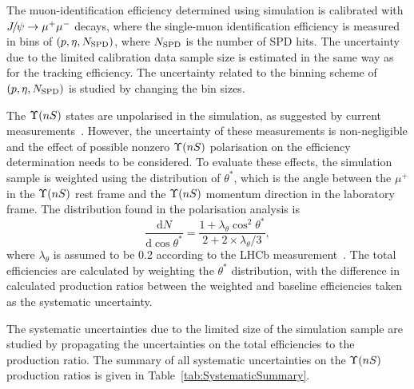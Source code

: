 \documentclass[12pt,a4paper]{article}
\def\Pmu         {\ensuremath{\upmu}\xspace}
\def\Ppsi        {\ensuremath{\uppsi}\xspace}
\def\PJ      {\ensuremath{\mathrm{J}}\xspace}
\def\Pmu         {\ensuremath{\mu}\xspace}
\def\Ppsi        {\ensuremath{\psi}\xspace}
\def\PJ      {\ensuremath{J}\xspace}
\def\mup        {{\ensuremath{\Pmu^+}}\xspace}
\def\mumu       {{\ensuremath{\Pmu^+\Pmu^-}}\xspace}
\def\jpsi     {{\ensuremath{{\PJ\mskip -3mu/\mskip -2mu\Ppsi}}}\xspace}
\def\to                 {\ensuremath{\rightarrow}\xspace}
\def\deriv {\ensuremath{\mathrm{d}}}
\begin{document}
The muon-identification efficiency determined using simulation is calibrated with $\jpsi\to\mumu$ decays, where the single-muon identification efficiency is measured in bins of $(p,\eta, N_{\rm{SPD}})$, where $N_{\rm{SPD}}$ is the number of SPD hits.
The uncertainty due to the limited calibration data sample size is estimated in the same way as for the tracking efficiency. 
The uncertainty related to the binning scheme of $(p,\eta, N_{\rm{SPD}})$ is studied by changing the bin sizes.

The $\Upsilon{(nS)}$ states are unpolarised in the simulation, as suggested by current measurements~\cite{LHCb:2017scf,CMS:2013qur}. 
However, the uncertainty of these measurements is non-negligible and the effect of possible nonzero $\Upsilon{(nS)}$ polarisation on the efficiency determination needs to be considered. 
To evaluate these effects, the simulation sample is weighted using the distribution of $\theta^*$, which is the angle between the $\mup$ in the $\Upsilon{(nS)}$ rest frame and the $\Upsilon{(nS)}$ momentum direction in the laboratory frame. The distribution found in the polarisation analysis is
\begin{equation}
\frac{\deriv N}{\deriv \cos \theta^*}=\frac{1+\lambda_\theta \cos ^2 \theta^*}{2+2 \times \lambda_\theta / 3},
\end{equation}
where $\lambda_\theta$ is assumed to be 0.2 according to the LHCb measurement~\cite{LHCb:2017scf}. 
The total efficiencies are calculated by weighting the $\theta^*$ 
distribution, with the difference in calculated production ratios between the weighted and baseline 
efficiencies taken as the systematic uncertainty.


The systematic uncertainties due to the limited size of the simulation sample are studied by propagating the uncertainties on the total efficiencies to the production ratio. The summary of all systematic uncertainties on the $\Upsilon{(nS)}$ production ratios is given in Table~\ref{tab:SystematicSummary}. 
\end{document}
